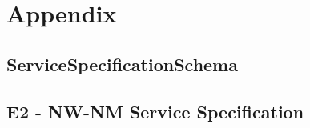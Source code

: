 \chapter{Appendix}

\section{ServiceSpecificationSchema}

\section{E2 - NW-NM Service Specification}

